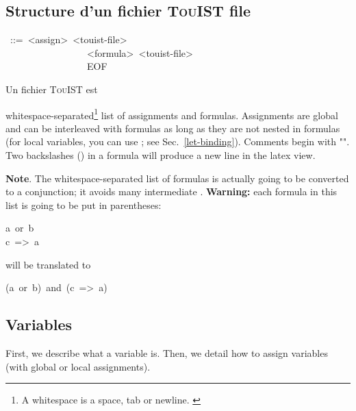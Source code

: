 \subsection{Structure d'un fichier {\scshape TouIST} file}\label{sec-structure-of-a-touist-file}%
\begin{mdpre}%
~::=~{\textless{}assign\textgreater{}}~{\textless{}touist-file\textgreater{}}\\
~~~~~~~~~~~~~~~~\textbar{}~{\textless{}formula\textgreater{}}~{\textless{}touist-file\textgreater{}}\\
~~~~~~~~~~~~~~~~\textbar{}~EOF%
\end{mdpre}\noindent Un fichier {\scshape TouIST} est 
{\color{red} whitespace-separated\footnote{\noindent A whitespace is a space, tab or newline.%
\label{fn-whitespace}%
} list of
assignments and formulas. Assignments are global and can be interleaved
with formulas as long as they are not nested in formulas (for local
variables, you can use ; see Sec.~\ref{let-binding}). Comments begin
with "". Two backslashes (\mdcode{\textbackslash{}\textbackslash{}}) in a formula will produce a new
line in the latex view.

\noindent\textbf{Note}.
The whitespace-separated list of formulas is actually going to be
converted to a conjunction; it avoids many intermediate .
\textbf{Warning:} each formula in this list is going to be put in
parentheses:%
\begin{mdpre}%
\noindent a~or~b\\
c~=\textgreater{}~a%
\end{mdpre}\noindent will be translated to
\begin{mdpre}%
\noindent(a~or~b)~and~(c~=\textgreater{}~a)%
\end{mdpre}\label{newline-and-note}%

\subsection{Variables}\label{sec-variables}%

\noindent First, we describe what a variable is. Then, we detail how to assign
variables (with global or local assignments).%

}
